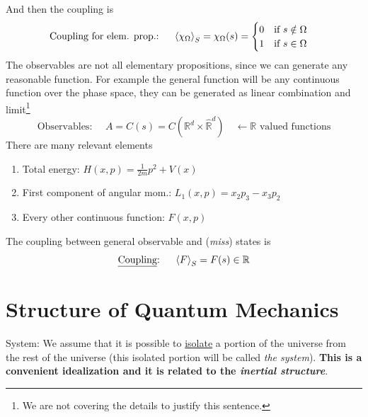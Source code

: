 \documentclass[../main.tex]{subfiles}
\begin{document}
And then the coupling is
\[
    \textrm{Coupling for elem. prop.: } \quad \expval{\chi_\Omega}_S= \chi_\Omega(s) = \begin{cases}
    0 \quad \textrm{if} \ s \notin \Omega\\
    1 \quad \textrm{if} \ s \in \Omega
    \end{cases}
\]
The observables are not all elementary propositions, since we can generate any reasonable function. For example the general function will be any continuous function over the phase space, they can be generated as linear combination and limit\footnote{We are not covering the details to justify this sentence.}
\[
    \textrm{Observables: } \quad A=C(s) = C\left(\mathbb{R}^d\times\hat{\mathbb{R}}^d\right) \quad \leftarrow\textrm{$\mathbb{R}$ valued functions}
\]
There are many relevant elements
\begin{enumerate}
    \item Total energy: \(H(x,p)=\frac{1}{2m}p^2+V(x)\)
    \item First component of angular mom.: \(L_1(x,p)=x_2p_3-x_3p_2\)
    \item Every other continuous function: $F(x,p)$
\end{enumerate}
The coupling between general observable and (\textit{miss}) states is
\[
    \textrm{\underline{Coupling}: } \quad \expval{F}_S= F(s)\in\mathbb{R}
\]
\section[Structure of QM]{Structure of Quantum Mechanics}
System: We assume that it is possible to \underline{isolate} a portion of the universe from the rest of the universe (this isolated portion will be called \textit{the system}). \textbf{This is a convenient idealization and it is related to the \textit{inertial structure}}.
\end{document}
